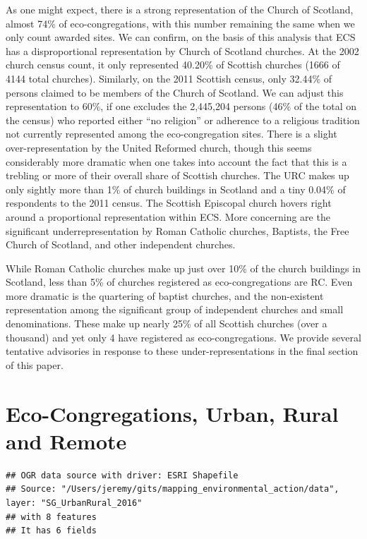 \documentclass[11pt,]{article}
\begin{document}
As one might expect, there is a strong representation of the Church of
Scotland, almost 74\% of eco-congregations, with this number remaining
the same when we only count awarded sites. We can confirm, on the basis
of this analysis that ECS has a disproportional representation by Church
of Scotland churches. At the 2002 church census count, it only
represented 40.20\% of Scottish churches (1666 of 4144 total churches).
Similarly, on the 2011 Scottish census, only 32.44\% of persons claimed
to be members of the Church of Scotland. We can adjust this
representation to 60\%, if one excludes the 2,445,204 persons (46\% of
the total on the census) who reported either ``no religion'' or
adherence to a religious tradition not currently represented among the
eco-congregation sites. There is a slight over-representation by the
United Reformed church, though this seems considerably more dramatic
when one takes into account the fact that this is a trebling or more of
their overall share of Scottish churches. The URC makes up only sightly
more than 1\% of church buildings in Scotland and a tiny 0.04\% of
respondents to the 2011 census. The Scottish Episcopal church hovers
right around a proportional representation within ECS. More concerning
are the significant underrepresentation by Roman Catholic churches,
Baptists, the Free Church of Scotland, and other independent churches.

While Roman Catholic churches make up just over 10\% of the church
buildings in Scotland, less than 5\% of churches registered as
eco-congregations are RC. Even more dramatic is the quartering of
baptist churches, and the non-existent representation among the
significant group of independent churches and small denominations. These
make up nearly 25\% of all Scottish churches (over a thousand) and yet
only 4 have registered as eco-congregations. We provide several
tentative advisories in response to these under-representations in the
final section of this paper.

\hypertarget{eco-congregations-urban-rural-and-remote}{%
\section{Eco-Congregations, Urban, Rural and
Remote}\label{eco-congregations-urban-rural-and-remote}}

\begin{verbatim}
## OGR data source with driver: ESRI Shapefile 
## Source: "/Users/jeremy/gits/mapping_environmental_action/data", layer: "SG_UrbanRural_2016"
## with 8 features
## It has 6 fields
\end{verbatim}
\end{document}
